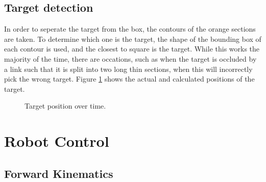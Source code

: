 \documentclass{article}
\begin{document}
\subsection{Target detection}

In order to seperate the target from the box, the contours of the orange sections are taken. To determine which one is the target, the shape of the bounding box of each contour is used, and the closest to square is the target. While this works the majority of the time,
there are occations, such as when the target is occluded by a link such that it is split into two long thin sections, when this will incorrectly pick the wrong target. Figure \ref{fig:visiontargetplot} shows the actual and calculated positions of the target. \\

\begin{figure}[h]
	\caption{Target position over time.}
	\label{fig:visiontargetplot}
\end{figure}

\section{Robot Control}

\subsection{Forward Kinematics}
\end{document}
